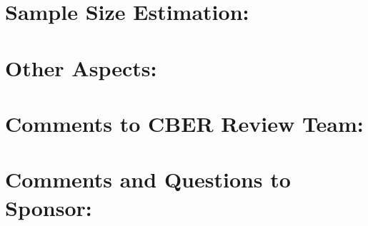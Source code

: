 \documentclass{article}
\begin{document}
\section{Sample Size Estimation: }


\section{Other Aspects: }


\section{Comments to CBER Review Team: }


\section{Comments and Questions to Sponsor: }

\end{document}
